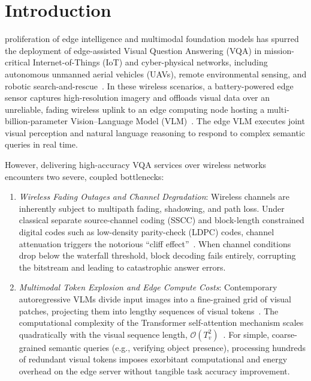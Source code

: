 \section{Introduction}\label{sec:intro}

 proliferation of edge intelligence and multimodal foundation models has spurred the deployment of edge-assisted Visual Question Answering (VQA) in mission-critical Internet-of-Things (IoT) and cyber-physical networks, including autonomous unmanned aerial vehicles (UAVs), remote environmental sensing, and robotic search-and-rescue~\cite{lobry2020rsvqa,zheng2024aerialee}. In these wireless scenarios, a battery-powered edge sensor captures high-resolution imagery and offloads visual data over an unreliable, fading wireless uplink to an edge computing node hosting a multi-billion-parameter Vision--Language Model (VLM)~\cite{wang2024qwen2vl,bai2025qwen25vl}. The edge VLM executes joint visual perception and natural language reasoning to respond to complex semantic queries in real time.

However, delivering high-accuracy VQA services over wireless networks encounters two severe, coupled bottlenecks:
\begin{enumerate}
    \item \textit{Wireless Fading Outages and Channel Degradation}: Wireless channels are inherently subject to multipath fading, shadowing, and path loss. Under classical separate source-channel coding (SSCC) and block-length constrained digital codes such as low-density parity-check (LDPC) codes, channel attenuation triggers the notorious ``cliff effect''~\cite{bourtsoulatze2019djscc}. When channel conditions drop below the waterfall threshold, block decoding fails entirely, corrupting the bitstream and leading to catastrophic answer errors.
    \item \textit{Multimodal Token Explosion and Edge Compute Costs}: Contemporary autoregressive VLMs divide input images into a fine-grained grid of visual patches, projecting them into lengthy sequences of visual tokens~\cite{wang2024qwen2vl}. The computational complexity of the Transformer self-attention mechanism scales quadratically with the visual sequence length, $\mathcal{O}(T_v^2)$~\cite{sabanovic2026inarvl}. For simple, coarse-grained semantic queries (e.g., verifying object presence), processing hundreds of redundant visual tokens imposes exorbitant computational and energy overhead on the edge server without tangible task accuracy improvement.
\end{enumerate}

